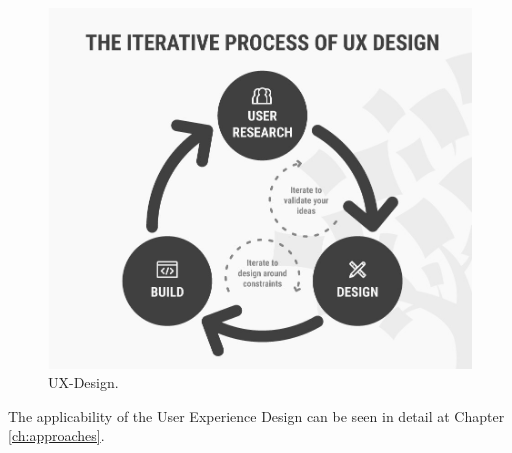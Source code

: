 \begin{figure}[hbt!]
	\centering
	\includegraphics[width=\linewidth]{figures/ux-design}
	\caption{UX-Design.\cite{UXD}}
	\label{fig:ux-design}
\end{figure}

The applicability of the User Experience Design can be seen in detail at Chapter \ref{ch:approaches}. 



\let\cleardoublepage\clearpage